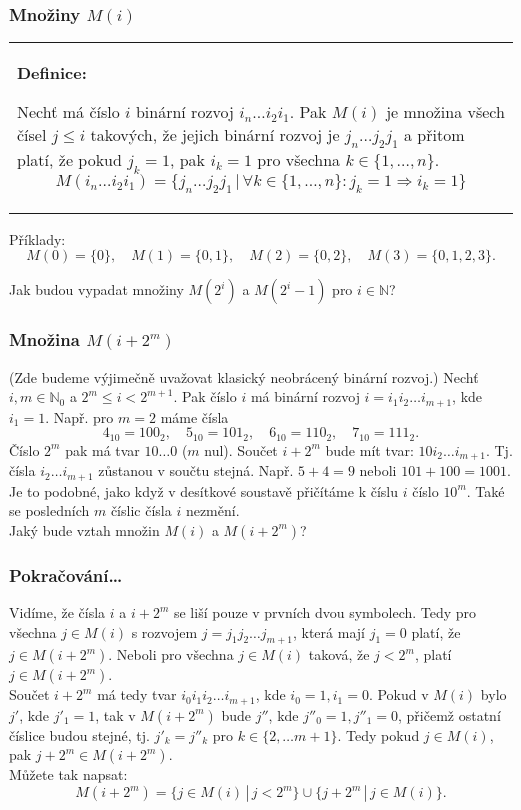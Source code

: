 \documentclass{beamer}
\newenvironment{definice}
{
    \begin{center}
    \begin{tabular}{p{9cm}}
    \textbf{Definice:}
}
{
    \end{tabular}
    \end{center}
}
\newcommand{\sep}{\,|\,}
\newcommand{\emptyline}{\\$\,$\\}
\begin{document}
\begin{frame}[t,fragile]\frametitle{Množiny $M(i)$} 
    \begin{definice}
        Nechť má číslo $i$ binární rozvoj $i_{n}\dots i_2i_1$. Pak $M(i)$ je množina všech čísel $j\le i$ takových, že jejich binární rozvoj je $j_{n}\dots j_2j_1$ a přitom platí, že pokud $j_k=1$, pak $i_k=1$ pro všechna $k\in\{1,\dots,n\}$.
        $$
M(i_{n}\dots i_2i_1)=\{j_{n}\dots j_2j_1\sep \forall k \in \{1,\dots,n\}: j_k=1\Rightarrow i_k=1\}
        $$
    \end{definice}

    Příklady: 
    $$
    M(0)=\{0\},\quad M(1) = \{0,1\},\quad M(2)=\{0,2\},\quad M(3)=\{0,1,2,3\}.
    $$

    Jak budou vypadat množiny $M(2^i)$ a $M(2^i-1)$ pro $i\in\mathbb{N}$? 
\end{frame}


\begin{frame}[t,fragile]\frametitle{Množina $M(i+2^m)$} 
(Zde budeme výjimečně uvažovat klasický neobrácený binární rozvoj.) Nechť $i,m\in\mathbb{N}_0$ a $2^m\le i < 2^{m+1}$. Pak číslo $i$ má binární rozvoj $i=i_1i_2\dots i_{m+1}$, kde $i_1=1$. Např. pro $m=2$ máme čísla 
$$
4_{10}=100_2,\quad 5_{10}=101_2,\quad 6_{10}=110_2,\quad 7_{10}=111_2.
$$
Číslo $2^m$ pak má tvar $10\dots0$ ($m$ nul). Součet $i+2^m$ bude mít tvar: $10i_2\dots i_{m+1}$. Tj. čísla $i_2\dots i_{m+1}$ zůstanou v součtu stejná. Např. $5+4=9$ neboli $101+100=1001$. 
\emptyline
Je to podobné, jako když v desítkové soustavě přičítáme k číslu $i$ číslo $10^m$. Také se posledních $m$ číslic čísla $i$ nezmění. 
\emptyline
Jaký bude vztah množin $M(i)$ a $M(i+2^m)$?
\emptyline

\end{frame}


\begin{frame}[t,fragile]\frametitle{Pokračování\dots} 
Vidíme, že čísla $i$ a $i+2^m$ se liší pouze v prvních dvou symbolech. Tedy pro všechna $j\in M(i)$ s rozvojem $j=j_1j_2\dots j_{m+1}$, která mají $j_1=0$ platí, že $j\in M(i+2^m)$. Neboli pro všechna $j\in M(i)$ taková, že $j<2^m$, platí $j\in M(i+2^m)$.
\emptyline
Součet $i+2^m$ má tedy tvar $i_0i_1i_2\dots i_{m+1}$, kde $i_0=1, i_1=0$. Pokud v $M(i)$ bylo $j'$, kde $j'_1=1$, tak v $M(i+2^m)$ bude $j''$, kde $j''_0=1, j''_1=0$, přičemž ostatní číslice budou stejné, tj. $j'_k=j''_k$ pro $k\in\{2,\dots m+1\}$. Tedy pokud $j\in M(i)$, pak $j+2^m\in M(i+2^m)$.
\emptyline
Můžete tak napsat:
$$
M(i+2^m) = \{j\in M(i)\sep j < 2^m \} \cup \{j+2^m\sep j\in M(i)\}.
$$
\end{frame}
\end{document}
